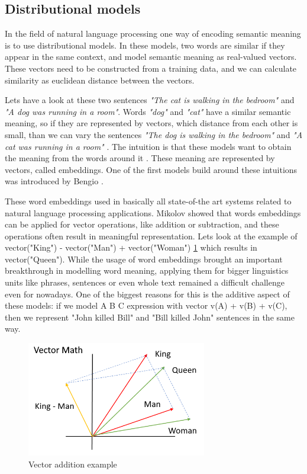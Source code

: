  \subsection{Distributional models}
 In the field of natural language processing one way of encoding semantic meaning is to use distributional models. In these models, two words are similar if they appear in the same context, and model semantic meaning as real-valued vectors. These vectors need to be constructed from a training data, and we can calculate similarity as euclidean distance between the vectors.
 
 Lets have a look at these two sentences \textit{"The cat is walking in the bedroom"} and \textit{"A dog was running in a room"}. Words \textit{"dog"} and \textit{"cat"} have a similar semantic meaning, so if they are represented by vectors, which distance from each other is small, than we can vary the sentences \textit{"The dog is walking in the bedroom"} and \textit{"A cat was running in a room"} \cite{Bengio:2003}. The intuition is that these models want to obtain the meaning from the words around it \cite{Jurafsky:2018}. These meaning are represented by vectors, called embeddings. One of the first models build around these intuitions was introduced by Bengio \cite{Bengio:2003}. 
 
 These word embeddings used in basically all state-of-the art systems related to natural language processing applications. Mikolov \cite{Mikolov:2013c} showed that words embeddings can be applied for vector operations, like addition or subtraction, and these operations often result in meaningful representation. Lets look at the example of vector("King") - vector("Man") + vector("Woman") \ref{fig:vecs} which results in vector("Queen"). While the usage of word embeddings brought an important breakthrough in modelling word meaning, applying them for bigger linguistics units like phrases, sentences or even whole text remained a difficult challenge even for nowadays. One of the biggest reasons for this is the additive aspect of these models: if we model A B C expression with vector v(A) + v(B) + v(C), then we represent "John killed Bill" and "Bill killed John" sentences in the same way. 
 
 \begin{figure}[h]
 	\centering
 	\includegraphics[width=0.7\textwidth]{figures/vecs}
 	\caption{Vector addition example}
 	\label{fig:vecs}
 \end{figure}
 
